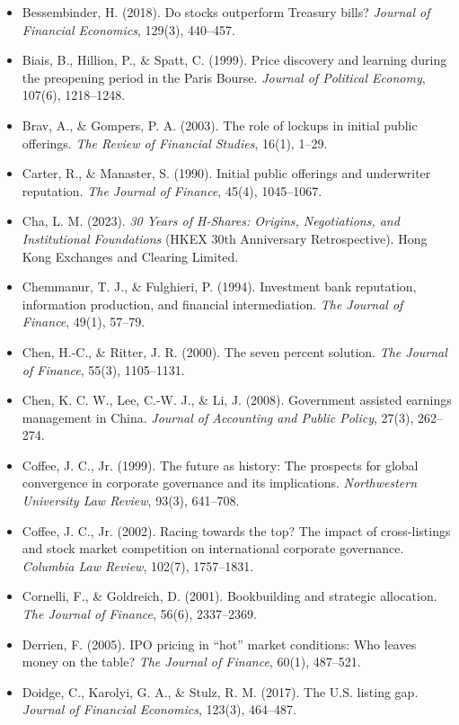 \documentclass[11pt,letterpaper]{article}
\begin{document}
\begin{itemize}
\item Bessembinder, H. (2018). Do stocks outperform Treasury bills? \textit{Journal of Financial Economics}, 129(3), 440–457.
\item Biais, B., Hillion, P., \& Spatt, C. (1999). Price discovery and learning during the preopening period in the Paris Bourse. \textit{Journal of Political Economy}, 107(6), 1218–1248.
\item Brav, A., \& Gompers, P. A. (2003). The role of lockups in initial public offerings. \textit{The Review of Financial Studies}, 16(1), 1–29.
\item Carter, R., \& Manaster, S. (1990). Initial public offerings and underwriter reputation. \textit{The Journal of Finance}, 45(4), 1045–1067.
\item Cha, L. M. (2023). \textit{30 Years of H-Shares: Origins, Negotiations, and Institutional Foundations} (HKEX 30th Anniversary Retrospective). Hong Kong Exchanges and Clearing Limited.
\item Chemmanur, T. J., \& Fulghieri, P. (1994). Investment bank reputation, information production, and financial intermediation. \textit{The Journal of Finance}, 49(1), 57–79.
\item Chen, H.-C., \& Ritter, J. R. (2000). The seven percent solution. \textit{The Journal of Finance}, 55(3), 1105–1131.
\item Chen, K. C. W., Lee, C.-W. J., \& Li, J. (2008). Government assisted earnings management in China. \textit{Journal of Accounting and Public Policy}, 27(3), 262–274.
\item Coffee, J. C., Jr. (1999). The future as history: The prospects for global convergence in corporate governance and its implications. \textit{Northwestern University Law Review}, 93(3), 641–708.
\item Coffee, J. C., Jr. (2002). Racing towards the top? The impact of cross-listings and stock market competition on international corporate governance. \textit{Columbia Law Review}, 102(7), 1757–1831.
\item Cornelli, F., \& Goldreich, D. (2001). Bookbuilding and strategic allocation. \textit{The Journal of Finance}, 56(6), 2337–2369.
\item Derrien, F. (2005). IPO pricing in ``hot'' market conditions: Who leaves money on the table? \textit{The Journal of Finance}, 60(1), 487–521.
\item Doidge, C., Karolyi, G. A., \& Stulz, R. M. (2017). The U.S. listing gap. \textit{Journal of Financial Economics}, 123(3), 464–487.

\end{itemize}
\end{document}
